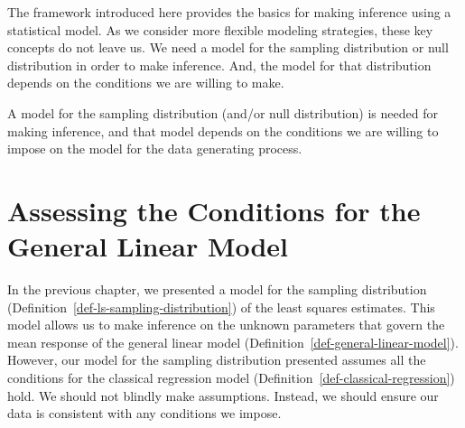 \documentclass[
  letterpaper,
  DIV=11,
  numbers=noendperiod]{scrreprt}
\theoremstyle{definition}
\theoremstyle{definition}
\theoremstyle{remark}
\begin{document}
The framework introduced here provides the basics for making inference
using a statistical model. As we consider more flexible modeling
strategies, these key concepts do not leave us. We need a model for the
sampling distribution or null distribution in order to make inference.
And, the model for that distribution depends on the conditions we are
willing to make.

\begin{tcolorbox}[enhanced jigsaw, left=2mm, toprule=.15mm, arc=.35mm, breakable, opacitybacktitle=0.6, opacityback=0, rightrule=.15mm, colbacktitle=quarto-callout-tip-color!10!white, coltitle=black, leftrule=.75mm, toptitle=1mm, colframe=quarto-callout-tip-color-frame, titlerule=0mm, title=\textcolor{quarto-callout-tip-color}{\faLightbulb}\hspace{0.5em}{Big Idea}, bottomrule=.15mm, colback=white, bottomtitle=1mm]

A model for the sampling distribution (and/or null distribution) is
needed for making inference, and that model depends on the conditions we
are willing to impose on the model for the data generating process.

\end{tcolorbox}

\hypertarget{sec-glm-assessing-conditions}{%
\chapter{Assessing the Conditions for the General Linear
Model}\label{sec-glm-assessing-conditions}}

\providecommand{\norm}[1]{\left\lVert#1\right\rVert}
\providecommand{\abs}[1]{\left\lvert#1\right\rvert}
\providecommand{\dist}[1]{\stackrel{\text{#1}}{\sim}}
\providecommand{\ind}[1]{\mathbb{I}\left(#1\right)}
\providecommand{\bm}[1]{\mathbf{#1}}
\providecommand{\bs}[1]{\boldsymbol{#1}}
\providecommand{\Ell}{\mathcal{L}}
\providecommand{\indep}{\perp\negthickspace\negmedspace\perp}

In the previous chapter, we presented a model for the sampling
distribution (Definition~\ref{def-ls-sampling-distribution}) of the
least squares estimates. This model allows us to make inference on the
unknown parameters that govern the mean response of the general linear
model (Definition~\ref{def-general-linear-model}). However, our model
for the sampling distribution presented assumes all the conditions for
the classical regression model
(Definition~\ref{def-classical-regression}) hold. We should not blindly
make assumptions. Instead, we should ensure our data is consistent with
any conditions we impose.
\end{document}
